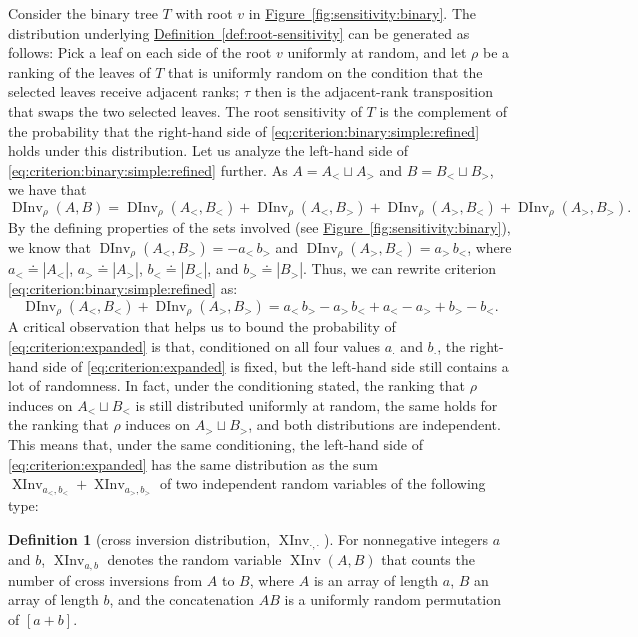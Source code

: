 \documentclass[11pt]{article}
\numberwithin{equation}{section}
\theoremstyle{definition}
\newtheorem{definition}[theorem]{Definition}
\theoremstyle{plain}
\newcommand{\expref}[2]{\hyperref[#2]{#1~\ref{#2}}}
\newcommand{\XInvD}{\XInv}
\newcommand{\ranking}{\rho}
\newcommand{\transposition}{\tau}
\DeclareMathOperator{\XInv}{XInv}
\DeclareMathOperator{\DInv}{DInv}
\begin{document}
Consider the binary tree $T$ with root $v$ in \expref{Figure}{fig:sensitivity:binary}. The distribution underlying \expref{Definition}{def:root-sensitivity} can be generated as follows: Pick a leaf on each side of the root $v$ uniformly at random, and let $\ranking$ be a ranking of the leaves of $T$ that is uniformly random on the condition that the selected leaves receive adjacent ranks; $\transposition$ then is the adjacent-rank transposition that swaps the two selected leaves. The root sensitivity of $T$ is the complement of the probability that the right-hand side of \eqref{eq:criterion:binary:simple:refined} holds under this distribution. Let us analyze the left-hand side of \eqref{eq:criterion:binary:simple:refined} further. As $A = A_< \sqcup A_>$ and $B = B_< \sqcup B_>$, we have that
\[ \DInv_\ranking(A,B) = \DInv_\ranking(A_<,B_<) + \DInv_\ranking(A_<,B_>) + \DInv_\ranking(A_>,B_<) + \DInv_\ranking(A_>,B_>). \]
By the defining properties of the sets involved (see \expref{Figure}{fig:sensitivity:binary}), we know that $\DInv_\ranking(A_<,B_>) = - a_< \, b_>$ and $\DInv_\ranking(A_>,B_<) = a_> \, b_<$, where $a_< \doteq |A_<|$, $a_> \doteq |A_>|$, $b_< \doteq |B_<|$, and $b_> \doteq |B_>|$. Thus, we can rewrite criterion \eqref{eq:criterion:binary:simple:refined} as:
\begin{equation}\label{eq:criterion:expanded}
\DInv_\ranking(A_<,B_<) + \DInv_\ranking(A_>,B_>) = a_< \, b_> - a_> \, b_< + a_< - a_> + b_> - b_<.
\end{equation}
A critical observation that helps us to bound the probability of \eqref{eq:criterion:expanded} is that, conditioned on all four values $a_{\cdot}$ and $b_{\cdot}$, the right-hand side of \eqref{eq:criterion:expanded} is fixed, but the left-hand side still contains a lot of randomness. In fact, under the conditioning stated, the ranking that $\ranking$ induces on $A_< \sqcup B_<$ is still distributed uniformly at random, the same holds for the ranking that $\ranking$ induces on $A_> \sqcup B_>$, and both distributions are independent. This means that, under the same conditioning, the left-hand side of \eqref{eq:criterion:expanded} has the same distribution as the sum $\XInvD_{a_<,b_<} + \XInvD_{a_>,b_>}$ of two independent random variables of the following type:
\begin{definition}[cross inversion distribution, $\XInvD_{\cdot,\cdot}$]
For nonnegative integers $a$ and $b$, $\XInvD_{a,b}$ denotes the random variable $\XInv(A,B)$ that counts the number of cross inversions from $A$ to $B$, where $A$ is an array of length $a$, $B$ an array of length $b$, and the concatenation $AB$ is a uniformly random permutation of $[a+b]$.
\end{definition}
\end{document}
